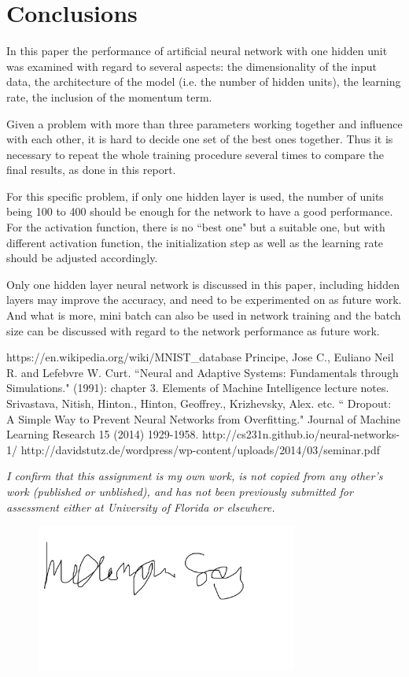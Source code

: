 \documentclass[conference]{IEEEtran}
\begin{document}
	
\section{Conclusions}  
In this paper the performance of artificial neural network with one hidden unit was examined with regard to several aspects: the dimensionality of the input data, the architecture of the model (i.e. the number of hidden units), the learning rate, the inclusion of the momentum term.

Given a problem with more than three parameters working together and influence with each other, it is hard to decide one set of the best ones together. Thus it is necessary to repeat the whole training procedure several times to compare the final results, as done in this report.

For this specific problem, if only one hidden layer is used, the number of units being 100 to 400 should be enough for the network to have a good performance. For the activation function, there is no ``best one" but a suitable one, but with different activation function, the initialization step as well as the learning rate should be adjusted accordingly. 

Only one hidden layer neural network is discussed in this paper, including hidden layers may improve the accuracy, and need to be experimented on as future work. And what is more, mini batch can also be used in network training and the batch size can be discussed with regard to the network performance as future work.


\begin{thebibliography}{00}
 https://en.wikipedia.org/wiki/MNIST\_database
 Principe, Jose C., Euliano Neil R. and Lefebvre W. Curt. ``Neural and Adaptive Systems: Fundamentals through Simulations." (1991): chapter 3.
 Elements of Machine Intelligence lecture notes.
 Srivastava, Nitish, Hinton., Hinton, Geoffrey., Krizhevsky, Alex. etc. `` Dropout: A Simple Way to Prevent Neural Networks from Overfitting." Journal of Machine Learning Research 15 (2014) 1929-1958.
 http://cs231n.github.io/neural-networks-1/
 http://davidstutz.de/wordpress/wp-content/uploads/2014/03/seminar.pdf
\end{thebibliography}

\emph{I confirm that this assignment is my own work, is not copied from any other's work (published or unblished), and has not been previously submitted for assessment either at University of Florida or elsewhere.}
	\begin{figure}[htbp]
	\centerline{\includegraphics[width=3.4in]{sig.jpg}}
	\end{figure}
\end{document}

